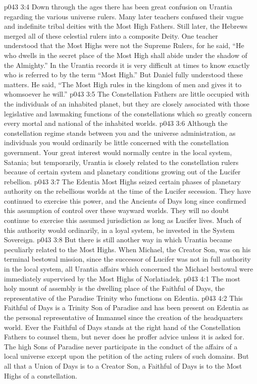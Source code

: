 \vs p043 3:4 \pc Down through the ages there has been great confusion on Urantia regarding the various universe rulers. Many later teachers confused their vague and indefinite tribal deities with the Most High Fathers. Still later, the Hebrews merged all of these celestial rulers into a composite Deity. One teacher understood that the Most Highs were not the Supreme Rulers, for he said, “He who dwells in the secret place of the Most High shall abide under the shadow of the Almighty.” In the Urantia records it is very difficult at times to know exactly who is referred to by the term “Most High.” But Daniel fully understood these matters. He said, “The Most High rules in the kingdom of men and gives it to whomsoever he will.”
\vs p043 3:5 \pc The Constellation Fathers are little occupied with the individuals of an inhabited planet, but they are closely associated with those legislative and lawmaking functions of the constellations which so greatly concern every mortal  and national  of the inhabited worlds.
\vs p043 3:6 Although the constellation regime stands between you and the universe administration, as individuals you would ordinarily be little concerned with the constellation government. Your great interest would normally centre in the local system, Satania; but temporarily, Urantia is closely related to the constellation rulers because of certain system and planetary conditions growing out of the Lucifer rebellion.
\vs p043 3:7 The Edentia Most Highs seized certain phases of planetary authority on the rebellious worlds at the time of the Lucifer secession. They have continued to exercise this power, and the Ancients of Days long since confirmed this assumption of control over these wayward worlds. They will no doubt continue to exercise this assumed jurisdiction as long as Lucifer lives. Much of this authority would ordinarily, in a loyal system, be invested in the System Sovereign.
\vs p043 3:8 But there is still another way in which Urantia became peculiarly related to the Most Highs. When Michael, the Creator Son, was on his terminal bestowal mission, since the successor of Lucifer was not in full authority in the local system, all Urantia affairs which concerned the Michael bestowal were immediately supervised by the Most Highs of Norlatiadek.
\vs p043 4:1 The most holy mount of assembly is the dwelling place of the Faithful of Days, the representative of the Paradise Trinity who functions on Edentia.
\vs p043 4:2 This Faithful of Days is a Trinity Son of Paradise and has been present on Edentia as the personal representative of Immanuel since the creation of the headquarters world. Ever the Faithful of Days stands at the right hand of the Constellation Fathers to counsel them, but never does he proffer advice unless it is asked for. The high Sons of Paradise never participate in the conduct of the affairs of a local universe except upon the petition of the acting rulers of such domains. But all that a Union of Days is to a Creator Son, a Faithful of Days is to the Most Highs of a constellation.
